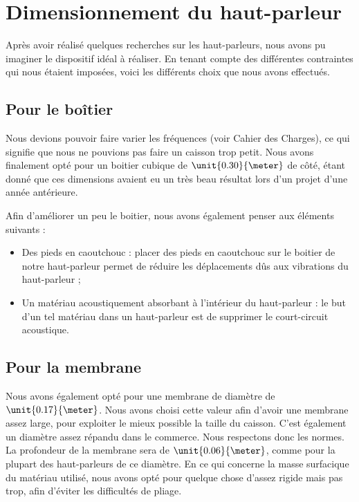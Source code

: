 

\section{Dimensionnement du haut-parleur}
Après avoir réalisé quelques recherches sur les haut-parleurs, nous avons pu imaginer le dispositif idéal à réaliser. En tenant compte des différentes contraintes qui nous étaient imposées, voici les différents choix que nous avons effectués.

\subsection{Pour le boîtier}
Nous devions pouvoir faire varier les fréquences (voir Cahier des Charges), ce qui signifie que nous ne pouvions pas faire un caisson trop petit. Nous avons finalement opté pour un
boitier cubique de $\unit{0.30}{\meter}$ de côté, étant donné que ces dimensions avaient eu un très beau résultat lors d'un projet d'une année antérieure.

Afin d'améliorer un peu le boitier, nous avons également penser aux éléments suivants :

\begin{itemize}
	\item	Des pieds en caoutchouc : placer des pieds en caoutchouc sur le boitier de notre haut-parleur
				permet de réduire les déplacements dûs aux vibrations du haut-parleur ;
	\item	Un matériau acoustiquement absorbant à l'intérieur du haut-parleur : le but d'un tel matériau
				dans un haut-parleur est de supprimer le court-circuit acoustique.
\end{itemize}

\subsection{Pour la membrane}
Nous avons également opté pour une membrane de diamètre de $\unit{0.17}{\meter}$. Nous avons choisi cette valeur afin d'avoir une membrane assez large, pour exploiter le mieux possible la taille du caisson. C'est également un diamètre assez répandu dans le commerce. Nous respectons donc les normes.
La profondeur de la membrane sera de $\unit{0.06}{\meter}$, comme pour la plupart des haut-parleurs de ce diamètre. En ce qui concerne la masse surfacique du matériau utilisé, nous avons opté pour quelque chose d'assez rigide mais pas trop, afin d'éviter les difficultés de pliage.

